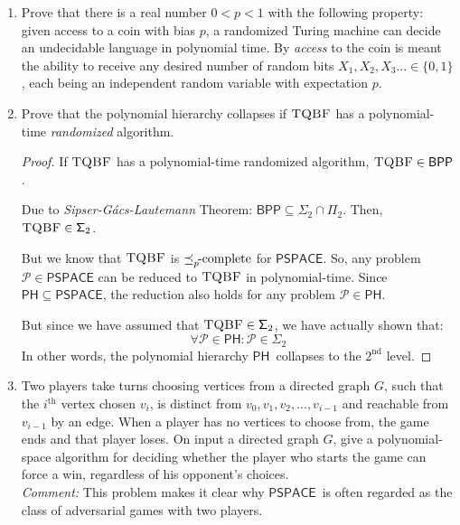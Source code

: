\documentclass[usletter]{article}
\newcommand {\langset}[1]      {\ensuremath{\mathcal{#1}}}
\newcommand {\namedlangset}[1] {\ensuremath{\textnormal{\textsc{#1}}}}
\newcommand {\family}[1]       {\ensuremath{\mathsf{#1}}}
\newcommand {\term}[1]      {\textit{#1}}
\newcommand {\namethm}[1]   {\term{#1} Theorem}
\newcommand {\reduce}[2]    {\ensuremath{\preceq_{#1}^{#2}}}
\newcommand {\complete}[2]  {\ensuremath{\reduce{#1}{#2}     %
                                         \hspace*{-4pt}\textnormal{-complete}}}
\newcommand {\PH}     {\family{PH}}
\newcommand {\BPP}    {\family{BPP}}
\newcommand {\PSPACE} {\family{PSPACE}}
\newcommand {\FPi}    {\family{\Pi}}
\newcommand {\FSigma} {\family{\Sigma}}
\begin{document}
\begin{enumerate}[labelsep=2.5em, label=\textbf{\arabic{enumi}}]
  \item Prove that there is a real number $0 < p < 1$ with the following
        property: given access to a coin with bias $p$, a randomized Turing
        machine can decide an undecidable language in polynomial time. By
        \textit{access} to the coin is meant the ability to receive any desired
        number of random bits $X_1, X_2, X_3 ... \in \{0,1\}$, each being an
        independent random variable with expectation $p$.


  \item Prove that the polynomial hierarchy collapses if \namedlangset{TQBF} has
        a polynomial-time \textit{randomized} algorithm.
  \begin{proof}
    If \namedlangset{TQBF} has a polynomial-time randomized algorithm,
    $\namedlangset{TQBF} \in \BPP$.

    Due to \namethm{Sipser-G\'{a}cs-Lautemann}\cite{Lautemann1983}:
    $\BPP \subseteq \FSigma_2 \cap \FPi_2$.
    Then, $\namedlangset{TQBF} \in \FSigma_2$.

    But we know that \namedlangset{TQBF} is \complete{p}{} for \PSPACE. So, any
    problem $\langset{P} \in \PSPACE$ can be reduced to \namedlangset{TQBF} in
    polynomial-time. Since $\PH \subseteq \PSPACE$, the reduction also holds for
    any problem $\langset{P} \in \PH$.

    But since we have assumed that $\namedlangset{TQBF} \in \FSigma_2$, we have
    actually shown that: \\
    $$ \forall \langset{P} \in \PH: \langset{P} \in \FSigma_2 $$
    In other words, the polynomial hierarchy \PH\ collapses to the $2^\text{nd}$
    level.
  \end{proof}


  \item Two players take turns choosing vertices from a directed graph $G$, such
        that the $i^\text{th}$ vertex chosen $v_i$, is distinct from $v_0, v_1,
        v_2, ..., v_{i-1}$ and reachable from $v_{i-1}$ by an edge. When a
        player has no vertices to choose from, the game ends and that player
        loses. On input a directed graph $G$, give a polynomial-space algorithm
        for deciding whether the player who starts the game can force a win,
        regardless of his opponent's choices. \\
        \textit{Comment:} This problem makes it clear why \PSPACE\ is often
        regarded as the class of adversarial games with two players.



\end{enumerate}
\end{document}
